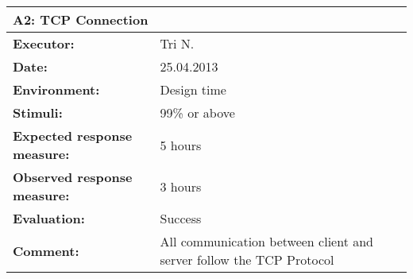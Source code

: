 \begin{tabular}{|m{}||m{}|}
\hline
\multicolumn{2}{|l|}{A2: TCP Connection} \\ \hline
\textbf{Executor:} & Tri N.\\ \hline
\textbf{Date:} & 25.04.2013\\ \hline
\textbf{Environment:} & Design time\\ \hline
\textbf{Stimuli:} & 99\% or above\\ \hline
\textbf{Expected response measure:} & 5 hours\\ \hline
\textbf{Observed response measure:} & 3 hours\\ \hline
\textbf{Evaluation:} & Success\\ \hline
\textbf{Comment:} & All communication between client and server follow the TCP Protocol\\ \hline
\end{tabular}